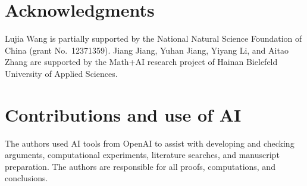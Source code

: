 \documentclass[10pt,a4paper]{amsart}
\numberwithin{equation}{section}
\theoremstyle{definition}
\theoremstyle{remark}
\begin{document}
\section*{Acknowledgments}

Lujia Wang is partially supported by the National Natural Science
Foundation of China (grant No.~12371359). Jiang Jiang, Yuhan Jiang,
Yiyang Li, and Aitao Zhang are
supported by the Math+AI research project of Hainan Bielefeld University
of Applied Sciences.

\section*{Contributions and use of AI}

The authors used AI tools from OpenAI to assist with developing and
checking arguments, computational experiments, literature searches,
and manuscript preparation.
The authors are responsible for all proofs, computations, and conclusions.
\end{document}
